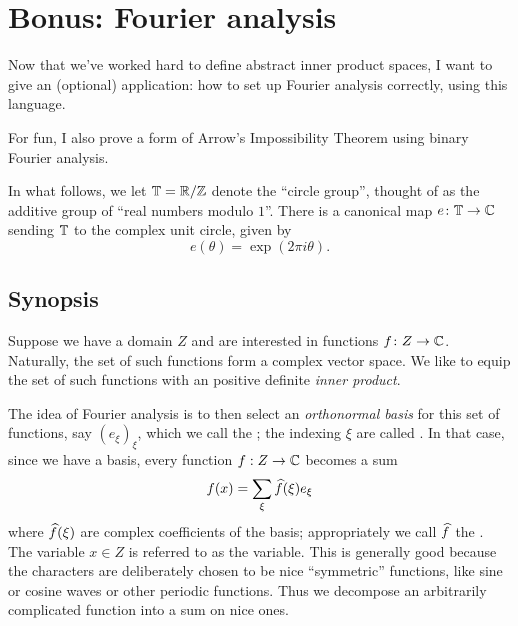 \chapter{Bonus: Fourier analysis}
\label{ch:fourier}
Now that we've worked hard to define abstract inner product spaces,
I want to give an (optional) application:
how to set up Fourier analysis correctly, using this language.

For fun, I also prove a form of Arrow's Impossibility Theorem
using binary Fourier analysis.

In what follows, we let $\mathbb T = \mathbb R/\mathbb Z$ denote the ``circle group'',
thought of as the additive group of ``real numbers modulo $1$''.
There is a canonical map $e \colon \mathbb T \to \mathbb C$ sending $\mathbb T$ to the
complex unit circle, given by
\[ e(\theta) = \exp(2\pi i \theta). \]

\section{Synopsis}
Suppose we have a domain $Z$ and are interested in functions $f \colon Z \to \mathbb C$.
Naturally, the set of such functions form a complex vector space.
We like to equip the set of such functions
with an positive definite \emph{inner product}.

The idea of Fourier analysis is to then select an \emph{orthonormal basis}
for this set of functions, say $(e_\xi)_{\xi}$,
which we call the ;
the indexing $\xi$ are called .
In that case, since we have a basis, every function $f : Z \to \mathbb C$
becomes a sum
\[ f(x) = \sum_{\xi} \widehat f(\xi) e_\xi \]
where $\widehat f(\xi)$ are complex coefficients of the basis;
appropriately we call $\widehat f$ the .
The variable $x \in Z$ is referred to as the  variable.
This is generally good because the characters are deliberately chosen
to be nice ``symmetric'' functions,
like sine or cosine waves or other periodic functions.
Thus we decompose an arbitrarily complicated function into a sum on nice ones.

